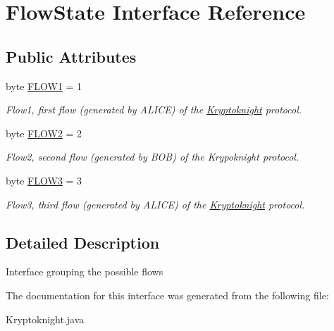 \hypertarget{class_flow_state}{
\section{Flow\-State Interface Reference}
\label{class_flow_state}
}
\subsection*{Public Attributes}
\begin{CompactItemize}
\item 
\hypertarget{class_flow_state_o0}{
byte \hyperlink{class_flow_state_o0}{FLOW1} = 1}
\label{class_flow_state_o0}

\begin{CompactList}\small\item\em Flow1, first flow (generated by ALICE) of the \hyperlink{class_kryptoknight}{Kryptoknight} protocol. \item\end{CompactList}\item 
\hypertarget{class_flow_state_o1}{
byte \hyperlink{class_flow_state_o1}{FLOW2} = 2}
\label{class_flow_state_o1}

\begin{CompactList}\small\item\em Flow2, second flow (generated by BOB) of the Krypoknight protocol. \item\end{CompactList}\item 
\hypertarget{class_flow_state_o2}{
byte \hyperlink{class_flow_state_o2}{FLOW3} = 3}
\label{class_flow_state_o2}

\begin{CompactList}\small\item\em Flow3, third flow (generated by ALICE) of the \hyperlink{class_kryptoknight}{Kryptoknight} protocol. \item\end{CompactList}\end{CompactItemize}


\subsection{Detailed Description}
Interface grouping the possible flows 



The documentation for this interface was generated from the following file:\begin{CompactItemize}
\item 
Kryptoknight.java\end{CompactItemize}
